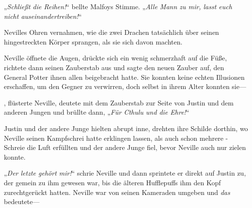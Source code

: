 „\emph{Schließt die Reihen!}“ bellte Malfoys Stimme. „\emph{Alle Mann zu mir, lasst euch nicht auseinandertreiben!}“

Nevilles Ohren vernahmen, wie die zwei Drachen tatsächlich über seinen hingestreckten Körper sprangen, als sie sich davon machten.

Neville öffnete die Augen, drückte sich ein wenig schmerzhaft auf die Füße, richtete dann seinen Zauberstab aus und sagte den neuen Zauber auf, den General Potter ihnen allen beigebracht hatte. Sie konnten keine echten Illusionen erschaffen, um den Gegner zu verwirren, doch selbst in ihrem Alter konnten sie—

,%
flüsterte Neville, deutete mit dem Zauberstab zur Seite von Justin und dem anderen Jungen und brüllte dann, „\emph{Für Cthulu und die Ehre!}“

Justin und der andere Junge hielten abrupt inne, drehten ihre Schilde dorthin, wo Neville seinen Kampfschrei hatte erklingen lassen, als auch schon mehrere -Schreie die Luft erfüllten und der andere Junge fiel, bevor Neville auch nur zielen konnte.

„\emph{Der letzte gehört mir!}“ schrie Neville und dann sprintete er direkt auf Justin zu, der gemein zu ihm gewesen war, bis die älteren Hufflepuffs ihm den Kopf zurechtgerückt hatten. Neville war von seinen Kameraden umgeben und \emph{das} bedeutete—

